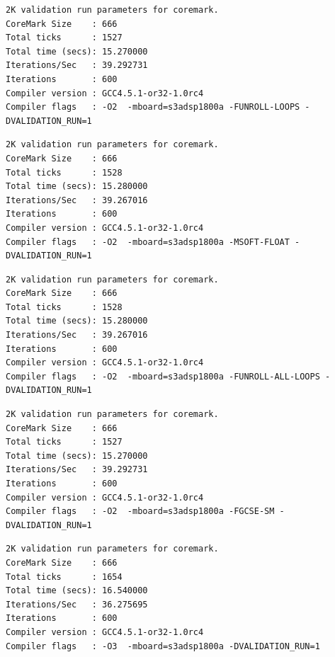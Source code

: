 \begin{lstlisting}[frame=single,caption={Optimización nivel -O2 - Flags activos : -FUNROLL-LOOPS },label={lst:salidasO2},breaklines]
2K validation run parameters for coremark.
CoreMark Size    : 666
Total ticks      : 1527
Total time (secs): 15.270000
Iterations/Sec   : 39.292731
Iterations       : 600
Compiler version : GCC4.5.1-or32-1.0rc4
Compiler flags   : -O2  -mboard=s3adsp1800a -FUNROLL-LOOPS -DVALIDATION_RUN=1  
\end{lstlisting}

\begin{lstlisting}[frame=single,caption={Optimización nivel -O2 - Flags activos : -MSOFT-FLOAT},label={lst:salidas},breaklines]
2K validation run parameters for coremark.
CoreMark Size    : 666
Total ticks      : 1528
Total time (secs): 15.280000
Iterations/Sec   : 39.267016
Iterations       : 600
Compiler version : GCC4.5.1-or32-1.0rc4
Compiler flags   : -O2  -mboard=s3adsp1800a -MSOFT-FLOAT -DVALIDATION_RUN=1  
\end{lstlisting}

\begin{lstlisting}[frame=single,caption={Optimización nivel -O2 - Flags activos : -FUNROLL-ALL-LOOPS},label={lst:salidas},breaklines]
2K validation run parameters for coremark.
CoreMark Size    : 666
Total ticks      : 1528
Total time (secs): 15.280000
Iterations/Sec   : 39.267016
Iterations       : 600
Compiler version : GCC4.5.1-or32-1.0rc4
Compiler flags   : -O2  -mboard=s3adsp1800a -FUNROLL-ALL-LOOPS -DVALIDATION_RUN=1  
\end{lstlisting}

\begin{lstlisting}[frame=single,caption={Optimización nivel -O2 - Flags activos : -FGCSE-SM},label={lst:salidas},breaklines]
2K validation run parameters for coremark.
CoreMark Size    : 666
Total ticks      : 1527
Total time (secs): 15.270000
Iterations/Sec   : 39.292731
Iterations       : 600
Compiler version : GCC4.5.1-or32-1.0rc4
Compiler flags   : -O2  -mboard=s3adsp1800a -FGCSE-SM -DVALIDATION_RUN=1  
\end{lstlisting}

\begin{lstlisting}[frame=single,caption={Optimización nivel -O3 - Sin Flags activos},label={lst:salidas},breaklines]
2K validation run parameters for coremark.
CoreMark Size    : 666
Total ticks      : 1654
Total time (secs): 16.540000
Iterations/Sec   : 36.275695
Iterations       : 600
Compiler version : GCC4.5.1-or32-1.0rc4
Compiler flags   : -O3  -mboard=s3adsp1800a -DVALIDATION_RUN=1  
\end{lstlisting}

